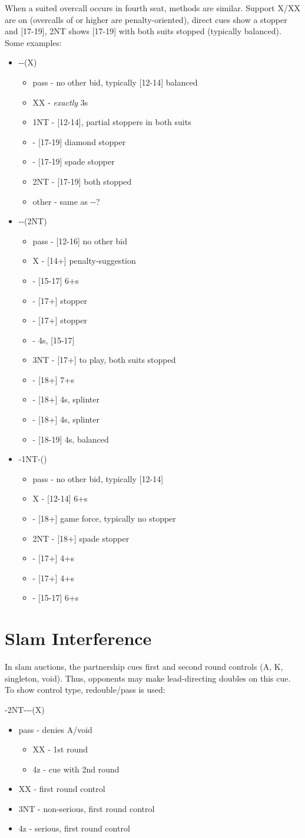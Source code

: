 \documentclass[12pt]{report}
\newcommand{\q}[1]{\multido{}{#1}{\qquad}}
\newcommand{\ul}[1]{\begin{itemize}#1\end{itemize}}
\newcommand{\li}[1]{\item[~] \q{#1}}
\begin{document}
    When a suited overcall occurs in fourth seat, methods are similar.  Support X/XX are on (overcalls of  or higher are penalty-oriented), direct cues show a stopper and [17-19], 2NT shows [17-19] with both suits stopped (typically balanced).  Some examples:

    \ul{
        \li0 --(X) \ul{
            \li0 pass - no other bid, typically [12-14] balanced
            \li0 XX - \textit{exactly} 3\he{}s
            \li0 1NT - [12-14], partial stoppers in both suits
            \li0 \di2 - [17-19] diamond stopper
            \li0 \sp2 - [17-19] spade stopper
            \li0 2NT - [17-19] both stopped
            \li0 other - same as \cl1-\he1-?
        }

        \li0 \cl1-\sp1-(2NT) \ul{
            \li0 pass - [12-16] no other bid
            \li0 X - [14+] penalty-suggestion
            \li0 \cl3 - [15-17] 6+\cl{}s
            \li0 \di3 - [17+] stopper
            \li0 \he3 - [17+] stopper
            \li0 \sp3 - 4\sp{}s, [15-17]
            \li0 3NT - [17+] to play, both suits stopped
            \li0 \cl4 - [18+] 7+\cl{}s
            \li0 \di4 - [18+] 4\sp{}s, splinter
            \li0 \di4 - [18+] 4\he{}s, splinter
            \li0 \sp4 - [18-19] 4\sp{}s, balanced
        }

        \li0 \he1-1NT-(\he2) \ul{
            \li0 pass - no other bid, typically [12-14]
            \li0 X - [12-14] 6+\he{}s
            \li0 \sp2 - [18+] game force, typically no stopper
            \li0 2NT - [18+] spade stopper
            \li0 \cl3 - [17+] 4+\cl{}s
            \li0 \di3 - [17+] 4+\di{}s
            \li0 \he3 - [15-17] 6+\he{}s
        }
    }

\section{Slam Interference} \label{3:7}

    In slam auctions, the partnership cues first and second round controls (A, K, singleton, void).  Thus, opponents may make lead-directing doubles on this cue.  To show control type, redouble/pass is used:

    -2NT---(X)
    \ul{
        \li0 pass - denies A/void \ul{
            \li0 XX - 1st round
            \li0 4z - cue with 2nd round
        }

        \li0 XX - first round control
        \li0 3NT - non-serious, first round control
        \li0 4z - serious, first round control
    }
\end{document}
